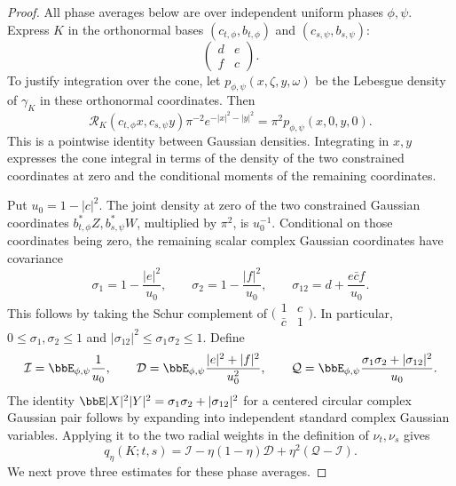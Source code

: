 \documentclass[11pt,reqno]{amsart}
\begin{document}
\begin{proof}
All phase averages below are over independent uniform phases $\phi,\psi$. Express $K$ in the orthonormal bases $(c_{t,\phi},b_{t,\phi})$ and $(c_{s,\psi},b_{s,\psi})$:
\[
 \begin{pmatrix}d&e\\ f&c\end{pmatrix}.
\]
To justify integration over the cone, let $p_{\phi,\psi}(x,\zeta,y,\omega)$ be the Lebesgue density of $\gamma_K$ in these orthonormal coordinates. Then
\[
 \mathcal R_K(c_{t,\phi}x,c_{s,\psi}y)
 \pi^{-2}e^{-|x|^2-|y|^2}
 =\pi^2 p_{\phi,\psi}(x,0,y,0).
\]
This is a pointwise identity between Gaussian densities. Integrating in $x,y$ expresses the cone integral in terms of the density of the two constrained coordinates at zero and the conditional moments of the remaining coordinates.

Put $u_0=1-|c|^2$. The joint density at zero of the two constrained Gaussian coordinates $b_{t,\phi}^*Z,b_{s,\psi}^*W$, multiplied by $\pi^2$, is $u_0^{-1}$. Conditional on those coordinates being zero, the remaining scalar complex Gaussian coordinates have covariance
\[
 \sigma_1=1-\frac{|e|^2}{u_0},\qquad
 \sigma_2=1-\frac{|f|^2}{u_0},\qquad
 \sigma_{12}=d+\frac{e\bar c f}{u_0}.
\]
This follows by taking the Schur complement of $\bigl(\begin{smallmatrix}1&c\\\bar c&1\end{smallmatrix}\bigr)$. In particular, $0\le\sigma_1,\sigma_2\le1$ and $|\sigma_{12}|^2\le\sigma_1\sigma_2\le1$.
Define
\[
 \mathcal I=\bbE_{\phi,\psi}\frac1{u_0},\qquad
 \mathcal D=\bbE_{\phi,\psi}\frac{|e|^2+|f|^2}{u_0^2},\qquad
 \mathcal Q=\bbE_{\phi,\psi}\frac{\sigma_1\sigma_2+|\sigma_{12}|^2}{u_0}.
\]
The identity $\bbE|X|^2|Y|^2=\sigma_1\sigma_2+|\sigma_{12}|^2$ for a centered circular complex Gaussian pair follows by expanding into independent standard complex Gaussian variables. Applying it to the two radial weights in the definition of $\nu_t,\nu_s$ gives
\begin{equation}\label{eq:cone-decomposition}
 q_\eta(K;t,s)=\mathcal I-\eta(1-\eta)\mathcal D+\eta^2(\mathcal Q-\mathcal I).
\end{equation}
We next prove three estimates for these phase averages.


\end{proof}
\end{document}
